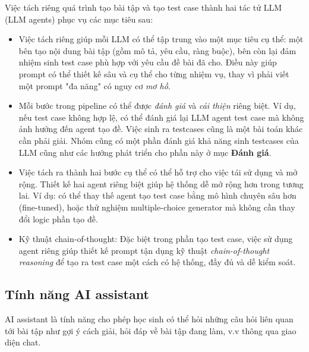 Việc tách riêng quá trình tạo bài tập và tạo test case thành hai tác tử LLM (LLM agents) phục vụ các mục tiêu sau:

\begin{itemize}
    \item Việc tách riêng giúp mỗi LLM có thể tập trung vào một mục tiêu cụ thể: một bên tạo nội dung bài tập (gồm mô tả, yêu cầu, ràng buộc), bên còn lại đảm nhiệm sinh test case phù hợp với yêu cầu đề bài đã cho. Điều này giúp prompt có thể thiết kế sâu và cụ thể cho từng nhiệm vụ, thay vì phải viết một prompt "đa năng" có nguy cơ \emph{mơ hồ}.

    \item Mỗi bước trong pipeline có thể được \emph{đánh giá} và \emph{cải thiện} riêng biệt. Ví dụ, nếu test case không hợp lệ, có thể đánh giá lại LLM agent test case mà không ảnh hưởng đến agent tạo đề. Việc sinh ra testcases cũng là một bài toán khác cần phải giải. Nhóm cũng có một phần đánh giá khả năng sinh testcases của LLM cũng như các hướng phát triển cho phần này ở mục \textbf{Đánh giá}.

    \item Việc tách ra thành hai bước cụ thể có thể hỗ trợ cho việc tái sử dụng và mở rộng. Thiết kế hai agent riêng biệt giúp hệ thống dễ mở rộng hơn trong tương lai. Ví dụ: có thể thay thế agent tạo test case bằng mô hình chuyên sâu hơn (fine-tuned), hoặc thử nghiệm multiple-choice generator mà không cần thay đổi logic phần tạo đề.

    \item Kỹ thuật chain-of-thought: Đặc biệt trong phần tạo test case, việc sử dụng agent riêng giúp thiết kế prompt tận dụng kỹ thuật \emph{chain-of-thought reasoning} để tạo ra test case một cách có hệ thống, đầy đủ và dễ kiểm soát.
\end{itemize}

\subsection{Tính năng AI assistant}
AI assistant là tính năng cho phép học sinh có thể hỏi những câu hỏi liên quan tới bài tập như gợi ý cách giải, hỏi đáp về bài tập đang làm, v.v thông qua giao diện chat.

